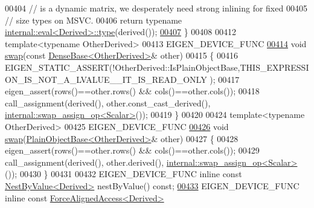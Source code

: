 \begin{DoxyCode}
00404       \textcolor{comment}{// is a dynamic matrix, we desperately need strong inlining for fixed}
00405       \textcolor{comment}{// size types on MSVC.}
00406       \textcolor{keywordflow}{return} \textcolor{keyword}{typename} \hyperlink{struct_eigen_1_1internal_1_1eval}{internal::eval<Derived>::type}(derived());
\hyperlink{group___core___module_a4ce80c44ce2092f18ddecdaaac71b3d0}{00407}     \}
00408     
00412     \textcolor{keyword}{template}<\textcolor{keyword}{typename} OtherDerived>
00413     EIGEN\_DEVICE\_FUNC
\hyperlink{group___core___module_ab420d9d588ac443f5a1b1a7dceb12c90}{00414}     \textcolor{keywordtype}{void} \hyperlink{group___core___module_ab420d9d588ac443f5a1b1a7dceb12c90}{swap}(\textcolor{keyword}{const} \hyperlink{group___core___module_class_eigen_1_1_dense_base}{DenseBase<OtherDerived>}& other)
00415     \{
00416       EIGEN\_STATIC\_ASSERT(!OtherDerived::IsPlainObjectBase,THIS\_EXPRESSION\_IS\_NOT\_A\_LVALUE\_\_IT\_IS\_READ\_ONLY
      );
00417       eigen\_assert(rows()==other.rows() && cols()==other.cols());
00418       call\_assignment(derived(), other.const\_cast\_derived(), 
      \hyperlink{struct_eigen_1_1internal_1_1swap__assign__op}{internal::swap\_assign\_op<Scalar>}());
00419     \}
00420 
00424     \textcolor{keyword}{template}<\textcolor{keyword}{typename} OtherDerived>
00425     EIGEN\_DEVICE\_FUNC
\hyperlink{group___core___module_aaab63cc56d30cc7c23a80304ab94ba2e}{00426}     \textcolor{keywordtype}{void} \hyperlink{group___core___module_aaab63cc56d30cc7c23a80304ab94ba2e}{swap}(\hyperlink{class_eigen_1_1_plain_object_base}{PlainObjectBase<OtherDerived>}& other)
00427     \{
00428       eigen\_assert(rows()==other.rows() && cols()==other.cols());
00429       call\_assignment(derived(), other.derived(), 
      \hyperlink{struct_eigen_1_1internal_1_1swap__assign__op}{internal::swap\_assign\_op<Scalar>}());
00430     \}
00431 
00432     EIGEN\_DEVICE\_FUNC \textcolor{keyword}{inline} \textcolor{keyword}{const} \hyperlink{group___core___module_class_eigen_1_1_nest_by_value}{NestByValue<Derived>} nestByValue() \textcolor{keyword}{const};
\hyperlink{group___core___module_ad3e01f9216955704228eaeac0b442d24}{00433}     EIGEN\_DEVICE\_FUNC \textcolor{keyword}{inline} \textcolor{keyword}{const} \hyperlink{group___core___module_class_eigen_1_1_force_aligned_access}{ForceAlignedAccess<Derived>} 

\end{DoxyCode}

